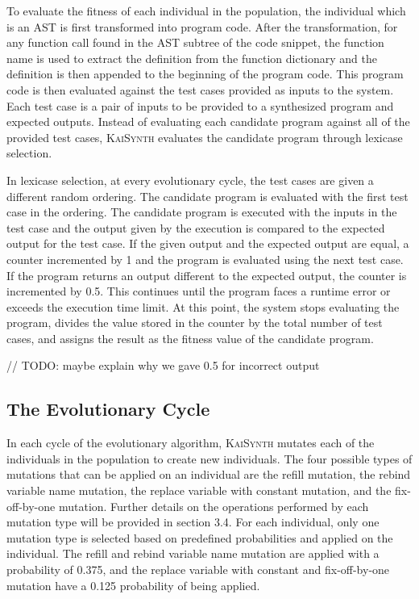 \documentclass{article}
\begin{document}
To evaluate the fitness of each individual in the population, the individual which is an AST is first transformed into program code. After the transformation, for any function call found in the AST subtree of the code snippet, the function name is used to extract the definition from the function dictionary and the definition is then appended to the beginning of the program code. This program code is then evaluated against the test cases provided as inputs to the system. Each test case is a pair of inputs to be provided to a synthesized program and expected outputs. Instead of evaluating each candidate program against all of the provided test cases, \textsc{KaiSynth} evaluates the candidate program through lexicase selection.

In lexicase selection, at every evolutionary cycle, the test cases are given a different random ordering. The candidate program is evaluated with the first test case in the ordering. The candidate program is executed with the inputs in the test case and the output given by the execution is compared to the expected output for the test case. If the given output and the expected output are equal, a counter incremented by 1 and the program is evaluated using the next test case. If the program returns an output different to the expected output, the counter is incremented by 0.5. This continues until the program faces a runtime error or exceeds the execution time limit. At this point, the system stops evaluating the program, divides the value stored in the counter by the total number of test cases, and assigns the result as the fitness value of the candidate program. 

// TODO: maybe explain why we gave 0.5 for incorrect output

\subsection{The Evolutionary Cycle}

In each cycle of the evolutionary algorithm, \textsc{KaiSynth} mutates each of the individuals in the population to create new individuals. The four possible types of mutations that can be applied on an individual are the refill mutation, the rebind variable name mutation, the replace variable with constant mutation, and the fix-off-by-one mutation. Further details on the operations performed by each mutation type will be provided in section 3.4. For each individual, only one mutation type is selected based on predefined probabilities and applied on the individual. The refill and rebind variable name mutation are applied with a probability of 0.375, and the replace variable with constant and fix-off-by-one mutation have a 0.125 probability of being applied.
\end{document}
